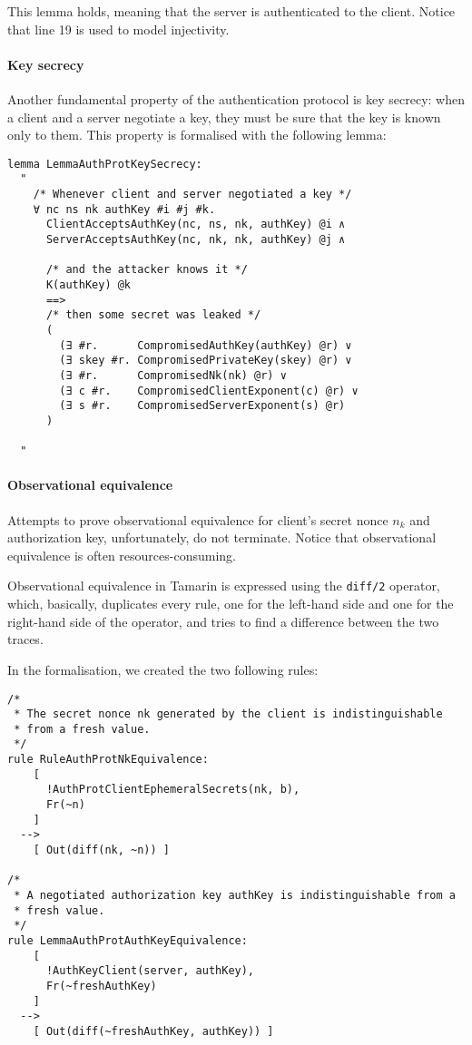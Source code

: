 This lemma holds, meaning that the server is authenticated to the client. Notice that line 19 is used to model injectivity.

\paragraph{Key secrecy}
Another fundamental property of the authentication protocol is key secrecy: when a client and a server negotiate a key, they must be sure that the key is known only to them. This property is formalised with the following lemma:
\begin{lstlisting}
lemma LemmaAuthProtKeySecrecy:
  "
    /* Whenever client and server negotiated a key */
    ∀ nc ns nk authKey #i #j #k.
      ClientAcceptsAuthKey(nc, ns, nk, authKey) @i ∧
      ServerAcceptsAuthKey(nc, nk, nk, authKey) @j ∧

      /* and the attacker knows it */
      K(authKey) @k
      ==>
      /* then some secret was leaked */
      (
        (∃ #r.      CompromisedAuthKey(authKey) @r) ∨
        (∃ skey #r. CompromisedPrivateKey(skey) @r) ∨
        (∃ #r.      CompromisedNk(nk) @r) ∨
        (∃ c #r.    CompromisedClientExponent(c) @r) ∨
        (∃ s #r.    CompromisedServerExponent(s) @r)
      )

  "
\end{lstlisting}

\paragraph{Observational equivalence}
Attempts to prove observational equivalence for client's secret nonce $n_k$ and authorization key, unfortunately, do not terminate. Notice that observational equivalence is often resources-consuming.

Observational equivalence in Tamarin is expressed using the \lstinline{diff/2} operator, which, basically, duplicates every rule, one for the left-hand side and one for the right-hand side of the operator, and tries to find a difference between the two traces.

In the formalisation, we created the two following rules:

\begin{lstlisting}
/*
 * The secret nonce nk generated by the client is indistinguishable 
 * from a fresh value.
 */
rule RuleAuthProtNkEquivalence:
    [
      !AuthProtClientEphemeralSecrets(nk, b),
      Fr(~n)
    ]
  -->
    [ Out(diff(nk, ~n)) ]

/*
 * A negotiated authorization key authKey is indistinguishable from a 
 * fresh value.
 */
rule LemmaAuthProtAuthKeyEquivalence:
    [
      !AuthKeyClient(server, authKey),
      Fr(~freshAuthKey)
    ]
  -->
    [ Out(diff(~freshAuthKey, authKey)) ]
\end{lstlisting}





